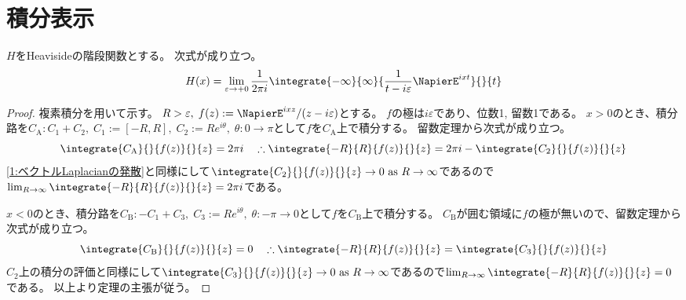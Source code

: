         \section{積分表示}
            \begin{shadebox}
                $H$をHeavisideの階段関数とする。
                次式が成り立つ。
                \[ H(x) = \lim_{\varepsilon\to +0}\frac{1}{2\pi i}\integrate{-\infty}{\infty}{\frac{1}{t-i\varepsilon}\NapierE^{ixt}}{}{t} \]
            \end{shadebox}
            \begin{proof}
                \quad\par
                複素積分を用いて示す。
                $R>\varepsilon,\;f(z) := \NapierE^{ixz}/(z-i\varepsilon)$とする。
                $f$の極は$i\varepsilon$であり、位数1, 留数1である。
                $x>0$のとき、積分路を$C_\mathrm{A}: C_1 + C_2,\; C_1 := [-R,R],\; C_2 := Re^{i\theta},\;\theta:0\to\pi$として$f$を$C_\mathrm{A}$上で積分する。
                留数定理から次式が成り立つ。
                \[ \integrate{C_\mathrm{A}}{}{f(z)}{}{z} = 2\pi i \quad \therefore \integrate{-R}{R}{f(z)}{}{z} = 2\pi i - \integrate{C_2}{}{f(z)}{}{z} \]
                \cite{数学備忘録}\ref{1:ベクトルLaplacianの発散}と同様にして$\integrate{C_2}{}{f(z)}{}{z} \to 0 \text{ as }R\to\infty$であるので$\lim_{R\to\infty}\integrate{-R}{R}{f(z)}{}{z} = 2\pi i$である。
                \par
                $x<0$のとき、積分路を$C_\mathrm{B}: -C_1 + C_3,\; C_3 := Re^{i\theta},\;\theta:-\pi\to 0$として$f$を$C_\mathrm{B}$上で積分する。
                $C_\mathrm{B}$が囲む領域に$f$の極が無いので、留数定理から次式が成り立つ。
                \[ \integrate{C_\mathrm{B}}{}{f(z)}{}{z} = 0 \quad \therefore \integrate{-R}{R}{f(z)}{}{z} = \integrate{C_3}{}{f(z)}{}{z} \]
                $C_\mathrm{2}$上の積分の評価と同様にして$\integrate{C_3}{}{f(z)}{}{z} \to 0 \text{ as }R\to\infty$であるので$\lim_{R\to\infty}\integrate{-R}{R}{f(z)}{}{z} = 0$である。
                以上より定理の主張が従う。
            \end{proof}
